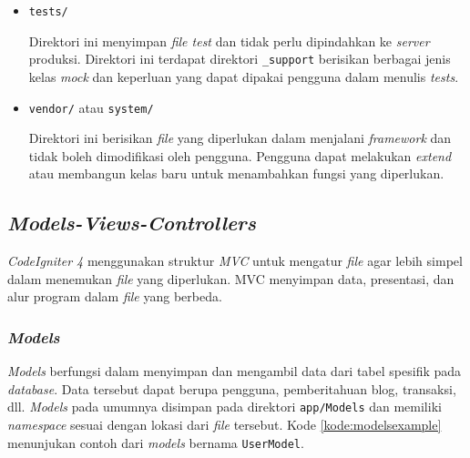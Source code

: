 \begin{itemize}
\item \texttt{tests/}

Direktori ini menyimpan \textit{file test} dan tidak perlu dipindahkan ke \textit{server} produksi. Direktori ini terdapat direktori \verb|_support| berisikan berbagai jenis kelas \textit{mock} dan keperluan yang dapat dipakai pengguna dalam menulis \textit{tests}.

\item \texttt{vendor/} atau \texttt{system/}

Direktori ini berisikan \textit{file} yang diperlukan dalam menjalani \textit{framework} dan tidak boleh dimodifikasi oleh pengguna. Pengguna dapat melakukan \textit{extend} atau membangun kelas baru untuk menambahkan fungsi yang diperlukan.

\end{itemize}

\subsection{\textit{Models-Views-Controllers}}
\textit{CodeIgniter 4} menggunakan struktur \textit{MVC} untuk mengatur \textit{file} agar lebih simpel dalam menemukan \textit{file} yang diperlukan. MVC menyimpan data, presentasi, dan alur program dalam \textit{file} yang berbeda.

\subsubsection{\textit{Models}}

\textit{Models} berfungsi dalam menyimpan dan mengambil data dari tabel spesifik pada \textit{database}. Data tersebut dapat berupa pengguna, pemberitahuan blog, transaksi, dll. \textit{Models} pada umumnya disimpan pada direktori \texttt{app/Models} dan memiliki \textit{namespace} sesuai dengan lokasi dari \textit{file} tersebut. Kode \ref{kode:modelsexample} menunjukan contoh dari \textit{models} bernama \texttt{UserModel}.

